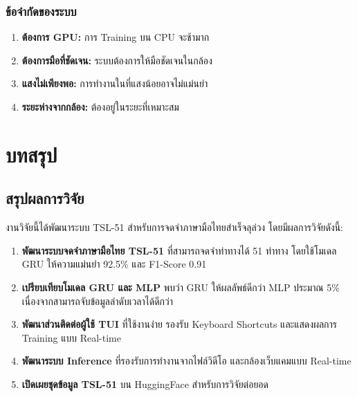 \documentclass[12pt,a4paper]{report}
\begin{document}
\subsection{ข้อจำกัดของระบบ}

\begin{enumerate}
    \item \textbf{ต้องการ GPU:} การ Training บน CPU จะช้ามาก
    \item \textbf{ต้องการมือที่ชัดเจน:} ระบบต้องการให้มือชัดเจนในกล้อง
    \item \textbf{แสงไม่เพียงพอ:} การทำงานในที่แสงน้อยอาจไม่แม่นยำ
    \item \textbf{ระยะห่างจากกล้อง:} ต้องอยู่ในระยะที่เหมาะสม
\end{enumerate}

\clearpage

\chapter{บทสรุป}

\section{สรุปผลการวิจัย}

งานวิจัยนี้ได้พัฒนาระบบ TSL-51 สำหรับการจดจำภาษามือไทยสำเร็จลุล่วง โดยมีผลการวิจัยดังนี้:

\begin{enumerate}
    \item \textbf{พัฒนาระบบจดจำภาษามือไทย TSL-51} ที่สามารถจดจำท่าทางได้ 51 ท่าทาง 
    โดยใช้โมเดล GRU ให้ความแม่นยำ 92.5\% และ F1-Score 0.91
    
    \item \textbf{เปรียบเทียบโมเดล GRU และ MLP} พบว่า GRU ให้ผลลัพธ์ดีกว่า MLP ประมาณ 5\%
    เนื่องจากสามารถจับข้อมูลลำดับเวลาได้ดีกว่า
    
    \item \textbf{พัฒนาส่วนติดต่อผู้ใช้ TUI} ที่ใช้งานง่าย รองรับ Keyboard Shortcuts 
    และแสดงผลการ Training แบบ Real-time
    
    \item \textbf{พัฒนาระบบ Inference} ที่รองรับการทำงานจากไฟล์วิดีโอ 
    และกล้องเว็บแคมแบบ Real-time
    
    \item \textbf{เปิดเผยชุดข้อมูล TSL-51} บน HuggingFace สำหรับการวิจัยต่อยอด
\end{enumerate}
\end{document}
